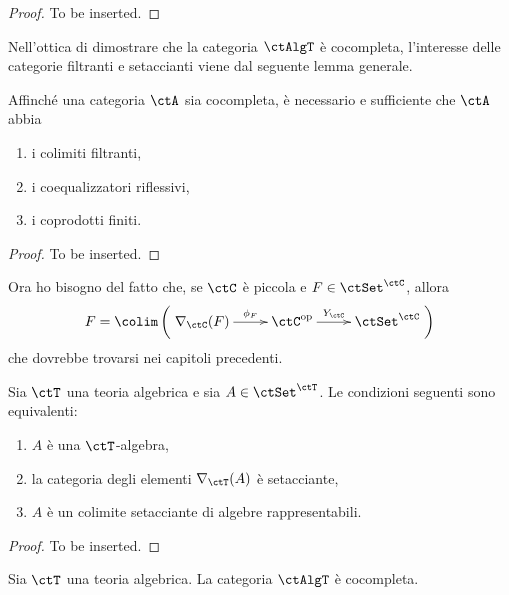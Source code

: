 \begin{proof}
To be inserted.
\end{proof}

Nell'ottica di dimostrare che la categoria $\ctAlgT$ è cocompleta, l'interesse delle categorie filtranti e setaccianti viene dal
seguente lemma generale.

\begin{lemma}\label{lemma_cocompl_sift}
Affinché una categoria $\ctA$ sia cocompleta, è necessario e sufficiente che $\ctA$ abbia
\begin{enumerate}
\item i colimiti filtranti,
\item i coequalizzatori riflessivi,
\item i coprodotti finiti.
\end{enumerate}
\end{lemma}

\begin{proof}
To be inserted.
\end{proof}

\begin{warning}\label{caveat_colim_rappr}
Ora ho bisogno del fatto che, se $\ctC$ è piccola e $F \in \ctSet^{\ctC}$, allora
\[
  F = \colim\left(\xymatrix{\Elts\ctC F \ar[r]^-{\phi_F} & \ctC^{\mathrm{op}} \ar[r]^-{Y_{\ctC}} & \ctSet^{\ctC}}\right)  
\]
che dovrebbe trovarsi nei capitoli precedenti.
\end{warning} 

\begin{lemma}\label{lemma_alg_sift_rapp}
Sia $\ctT$ una teoria algebrica e sia $A \in \ctSet^{\ctT}$. Le condizioni seguenti sono equivalenti:
\begin{enumerate}
\item $A$ è una $\ctT$-algebra,
\item la categoria degli elementi $\Elts{\ctT}A$ è setacciante,
\item $A$ è un colimite setacciante di algebre rappresentabili.
\end{enumerate}
\end{lemma}

\begin{proof}
To be inserted.
\end{proof}

\begin{proposition}\label{prop_AlgT_cocompl}
Sia $\ctT$ una teoria algebrica. La categoria $\ctAlgT$ è cocompleta.
\end{proposition}

